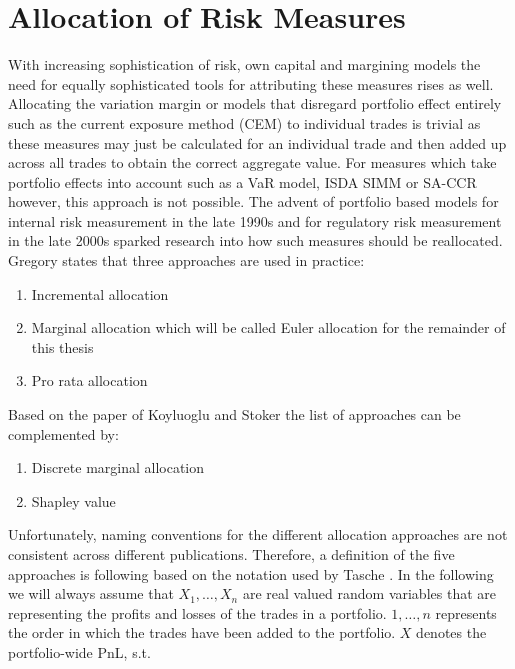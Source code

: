 \documentclass[../Thesis_AHoecherl.tex]{subfiles}
\begin{document}
\section{Allocation of Risk Measures}\label{sec:Allocation of Risk Measures}

With increasing sophistication of risk, own capital and margining models the need for equally sophisticated tools for attributing these measures rises as well. Allocating the variation margin or models that disregard portfolio effect entirely such as the current exposure method (CEM) to individual trades is trivial as these measures may just be calculated for an individual trade and then added up across all trades to obtain the correct aggregate value. 
For measures which take portfolio effects into account such as a \gls{VaR} model, \gls{ISDA SIMM} or \gls{SA-CCR} however, this approach is not possible. The advent of portfolio based models for internal risk measurement in the late 1990s and for regulatory risk measurement in the late 2000s sparked research into how such measures should be reallocated. Gregory \cite[Chapter~10.7]{gregory2015xva} states that three approaches are used in practice: 
\begin{enumerate}
\item Incremental allocation
\item Marginal allocation which will be called Euler allocation for the remainder of this thesis  
\item Pro rata allocation
\end{enumerate}

Based on the paper of Koyluoglu and Stoker \cite{koyluoglu2002risk} the list of approaches can be complemented by:
\begin{enumerate}[resume]
    \item Discrete marginal allocation
    \item Shapley value
\end{enumerate}
 
Unfortunately, naming conventions for the different allocation approaches are not consistent across different publications.
Therefore, a definition of the five approaches is following based on the notation used by Tasche \cite{tasche2007}. In the following we will always assume that $X_1, \dots, X_n$ are real valued random variables that are representing the profits and losses of the trades in a portfolio. $1, \dots, n$ represents the order in which the trades have been added to the portfolio. $X$ denotes the portfolio-wide \gls{PnL}, s.t.
\end{document}
